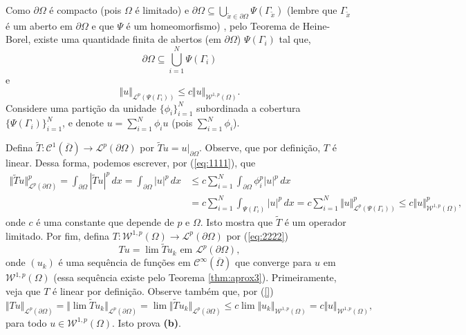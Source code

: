 \documentclass[a4paper, 11pt]{book}
\theoremstyle{definition}
\newcommand{\cC}{\mathcal{C}}
\newcommand{\cL}{\mathcal{L}}
\newcommand{\cW}{\mathcal{W}}
\begin{document}
\begin{prf}
    Como $\partial\Omega$ é compacto (pois $\Omega$ é limitado) e $\partial \Omega \subseteq \bigcup_{\tilde x \in \partial \Omega} \Psi(\Gamma_{\tilde x})$ (lembre que $\Gamma_{\tilde x}$ é um aberto em $\partial\Omega$ e que $\Psi$ é um homeomorfismo) , pelo Teorema de Heine-Borel, existe uma quantidade finita de abertos (em $\partial \Omega$) $\Psi(\Gamma_i)$ tal que,
    \[
        \partial\Omega \subseteq \bigcup_{i=1}^N \Psi(\Gamma_i)
    \]
    e
    \begin{equation} \label{eq:1111}
        \Vert u \Vert_{\cL^p(\Psi(\Gamma_i))} \leqslant c \Vert u \Vert_{\cW^{1,p}(\Omega)}.
    \end{equation}
    Considere uma partição da unidade $\{\phi_i\}_{i=1}^N$ subordinada a cobertura $\{\Psi(\Gamma_i)\}_{i=1}^N$, e denote $u = \sum_{i=1}^N \phi_i u$ (pois $\sum_{i=1}^N \phi_i$).

    Defina $\widetilde T : \cC^1(\overline \Omega) \to \cL^p(\partial\Omega)$ por $\widetilde T u = u |_{\partial \Omega}$.
    Observe, que por definição, $T$ é linear.
    Dessa forma, podemos escrever, por (\ref{eq:1111}), que
    \begin{equation} \label{eq:2222}
        \begin{aligned}
            \Vert \widetilde Tu \Vert_{\cL^p(\partial \Omega)}^p = \int_{\partial\Omega} | \widetilde T u|^p \,dx = \int_{\partial\Omega} |u|^p \,dx &\leqslant c \sum_{i=1}^{N} \int_{\partial \Omega} \phi_i^p |u|^p \,dx\\ 
            &= c \sum_{i=1}^N \int_{\Psi(\Gamma_i)} |u|^p \,dx = c\sum_{i=1}^N \Vert u \Vert_{\cL^p(\Psi(\Gamma_i))}^p \leqslant c\Vert u \Vert_{\cW^{1,p}(\Omega)}^p,
        \end{aligned}
    \end{equation}
    onde $c$ é uma constante que depende de $p$ e $\Omega$. Isto mostra que $\widetilde T$ é um operador limitado.
    Por fim, defina $T : \cW^{1,p}(\Omega) \to \cL^p(\partial \Omega)$ por (\ref{eq:2222})
    \[
        T u = \lim \widetilde T u_k \text{ em } \cL^p(\partial \Omega),
    \]
    onde $(u_k)$ é uma sequência de funções em $\cC^{\infty}(\overline\Omega)$ que converge para $u$ em $\cW^{1,p}(\Omega)$ (essa sequência existe pelo Teorema \ref{thm:aprox3}). 
    Primeiramente, veja que $T$ é linear por definição.
    Observe também que, por (\ref{})
    \[
        \Vert Tu \Vert_{\cL^p(\partial \Omega)} = \Vert \lim \widetilde T u_k \Vert_{\cL^p(\partial \Omega)} = \lim \Vert \widetilde T u_k \Vert_{\cL^p(\partial \Omega)} \leqslant c \lim \Vert u_k \Vert_{\cW^{1,p}(\Omega)} = c \Vert u \Vert_{\cW^{1,p}(\Omega)},
    \]
    para todo $u \in \cW^{1,p}(\Omega)$. Isto prova \textbf{(b)}.


\end{prf}
\end{document}
